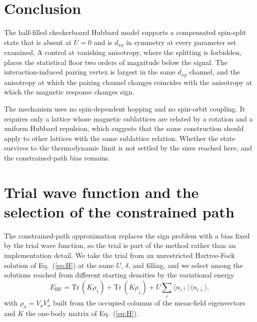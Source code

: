 \documentclass[aps,prb,reprint,superscriptaddress,amsmath,amssymb,floatfix]{revtex4-2}
\begin{document}
\section{Conclusion}

The half-filled checkerboard Hubbard model supports a compensated spin-split
state that is absent at $U = 0$ and is $d_{xy}$ in symmetry at every parameter
set examined. A control at vanishing anisotropy, where the splitting is
forbidden, places the statistical floor two orders of magnitude below the
signal. The interaction-induced pairing vertex is largest in the same $d_{xy}$
channel, and the anisotropy at which the pairing channel changes coincides with
the anisotropy at which the magnetic response changes sign.

The mechanism uses no spin-dependent hopping and no spin-orbit coupling. It
requires only a lattice whose magnetic sublattices are related by a rotation and
a uniform Hubbard repulsion, which suggests that the same construction should
apply to other lattices with the same sublattice relation. Whether the state
survives to the thermodynamic limit is not settled by the sizes reached here,
and the constrained-path bias remains.

\appendix

\section{Trial wave function and the selection of the constrained path}
\label{app:trial}

The constrained-path approximation replaces the sign problem with a bias fixed
by the trial wave function, so the trial is part of the method rather than an
implementation detail. We take the trial from an unrestricted Hartree-Fock
solution of Eq.~(\ref{eq:H}) at the same $U$, $\delta$, and filling, and we
select among the solutions reached from different starting densities by the
variational energy
\begin{equation}
E_{\mathrm{HF}} = \mathrm{Tr}\,(K \rho_{\uparrow}) + \mathrm{Tr}\,(K \rho_{\downarrow})
                + U \sum_i \langle n_{i\uparrow}\rangle \langle n_{i\downarrow}\rangle ,
\label{eq:ehf}
\end{equation}
with $\rho_{\sigma} = V_{\sigma} V_{\sigma}^{\dagger}$ built from the occupied
columns of the mean-field eigenvectors and $K$ the one-body matrix of
Eq.~(\ref{eq:H}).
\end{document}
